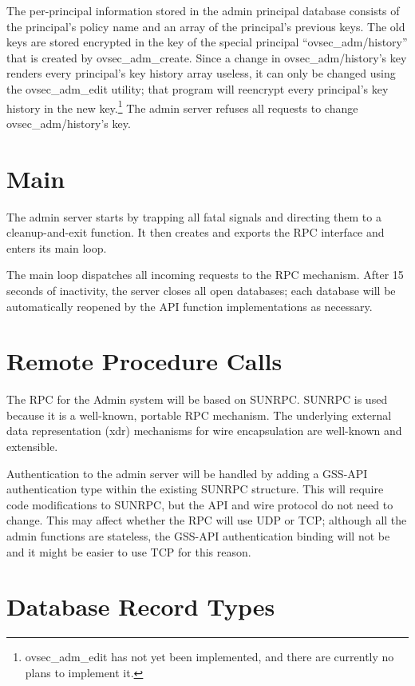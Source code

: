 The per-principal information stored in the admin principal database
consists of the principal's policy name and an array of the
principal's previous keys.  The old keys are stored encrypted in the
key of the special principal ``ovsec_adm/history'' that is created by
ovsec_adm_create.  Since a change in ovsec_adm/history's key renders
every principal's key history array useless, it can only be changed
using the ovsec_adm_edit utility; that program will reencrypt every
principal's key history in the new key.\footnote{ovsec_adm_edit has
not yet been implemented, and there are currently no plans to
implement it.}  The admin server refuses all requests to change
ovsec_adm/history's key.

\section{Main}

The admin server starts by trapping all fatal signals and directing
them to a cleanup-and-exit function.  It then creates and exports the
RPC interface and enters its main loop.

The main loop dispatches all incoming requests to the RPC mechanism.
After 15 seconds of inactivity, the server closes all open databases;
each database will be automatically reopened by the API function
implementations as necessary.

\section{Remote Procedure Calls}

The RPC for the Admin system will be based on SUNRPC.  SUNRPC is used
because it is a well-known, portable RPC mechanism.  The underlying
external data representation (xdr) mechanisms for wire encapsulation
are well-known and extensible.

Authentication to the admin server will be handled by adding a GSS-API
authentication type within the existing SUNRPC structure.  This will
require code modifications to SUNRPC, but the API and wire protocol do
not need to change.  This may affect whether the RPC will use UDP or
TCP; although all the admin functions are stateless, the GSS-API
authentication binding will not be and it might be easier to use TCP
for this reason.

\section{Database Record Types}
\label{sec:db-types}

